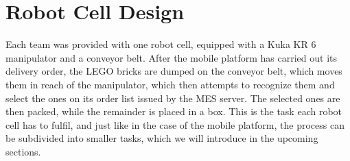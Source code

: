 \chapter{Robot Cell Design}\label{chap:robot_cell_chapter}

Each team was provided with one robot cell, equipped with a Kuka KR 6 manipulator and a conveyor belt. After the mobile platform has carried out its delivery order, the LEGO bricks are dumped on the conveyor belt, which moves them in reach of the manipulator, which then attempts to recognize them and select the ones on its order list issued by the MES server. The selected ones are then packed, while the remainder is placed in a box. This is the task each robot cell has to fulfil, and just like in the case of the mobile platform, the process can be subdivided into smaller tasks, which we will introduce in the upcoming sections.

















